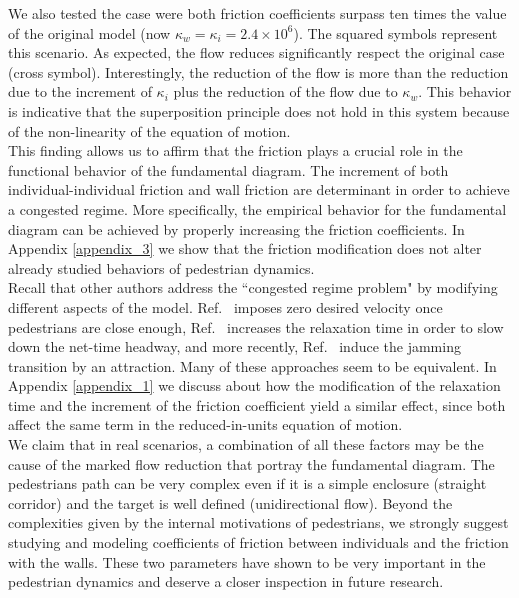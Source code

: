 We also tested the case were both friction coefficients surpass ten times the value of the original model (now $\kappa_w = \kappa_i = 2.4\times10^{6}$). The squared symbols represent this scenario. As expected, the flow reduces significantly respect the original case (cross symbol). Interestingly, the reduction of the flow is more than the reduction due to the increment of $\kappa_i$ plus the reduction of the flow due to $\kappa_w$. This behavior is indicative that the superposition principle does not hold in this system because of the non-linearity of the equation of motion.   \\

This finding allows us to affirm that the friction plays a crucial role in the functional behavior of the fundamental diagram. The increment of both individual-individual friction and wall friction are determinant in order to achieve a congested regime. More specifically, the empirical behavior for the fundamental diagram can be achieved by properly increasing the friction coefficients. In Appendix \ref{appendix_3} we show that the friction modification does not alter already studied behaviors of pedestrian dynamics.\\

Recall that other authors address the ``congested regime problem" by modifying different aspects of the model. Ref.~\cite{parisi2} imposes zero desired velocity once pedestrians are close enough, Ref.~\cite{johansson} increases the relaxation time in order to slow down the net-time headway, and more recently,  Ref.~\cite{kwak} induce the jamming transition by an attraction. Many of these approaches seem to be equivalent. In Appendix \ref{appendix_1} we discuss about how the modification of the relaxation time and the increment of the friction coefficient yield a similar effect, since both affect the same term in the reduced-in-units equation of motion. \\

We claim that in real scenarios, a combination of all these factors may be the cause of the marked flow reduction that portray the fundamental diagram. The pedestrians path can be very complex even if it is a simple enclosure (straight corridor) and the target is well defined (unidirectional flow). Beyond the complexities given by the internal motivations of pedestrians, we strongly suggest studying and modeling coefficients of friction between individuals and the friction with the walls. These two parameters have shown to be very important in the pedestrian dynamics and deserve a closer inspection in future research.\\

